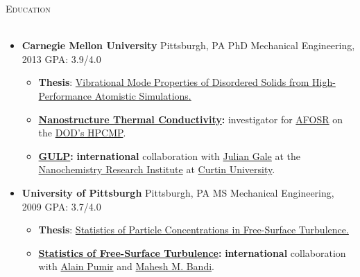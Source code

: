 \documentclass{article}
\newcommand{\area}[2]{\vspace*{-9pt} \begin{verse}\textbf{#1}   #2 \end{verse}  }
\newcommand{\lineunder}{\vspace*{-8pt} \\ \hspace*{-18pt} \hrulefill \\}
\newcommand{\header}[1]{{\hspace*{-15pt}\vspace*{6pt} \textsc{#1}} \vspace*{-6pt} \lineunder}
\newcommand{\schoolwithcourses}[3]{
 \textbf{#1} #2 $\bullet$ #3\\ 
\vspace*{5pt}
}
\begin{document}
\begin{itemize}
\header{\large{Education}}

\begin{itemize}[leftmargin=*]
  \item \textbf{Carnegie Mellon University} Pittsburgh, PA PhD Mechanical Engineering, 2013 GPA: 3.9/4.0
  \begin{itemize}
    \item \textbf{Thesis}: \href{http://jasonlarkin.github.io/projects-phd.html}
    {Vibrational Mode Properties of Disordered Solids from High-Performance Atomistic Simulations.}
    \item \textbf{\href{http://ntpl.me.cmu.edu/research.html}{Nanostructure Thermal Conductivity}:} investigator for  
\href{http://www.wpafb.af.mil/afrl/afosr/}{AFOSR} on the \href{http://www.hpcmo.hpc.mil/cms2/index.php}{DOD's HPCMP}.
    \item \textbf{\href{https://nanochemistry.curtin.edu.au/local/docs/gulp/gulp4.2_manual.pdf}{GULP}:} \textbf{international} collaboration with \href{http://nanochemistry.curtin.edu.au/people/staff.cfm/J.Gale}{Julian Gale} at the 
\href{http://nanochemistry.curtin.edu.au/}{Nanochemistry Research Institute} at \href{http://www.curtin.edu.au/}{Curtin University}.
  \end{itemize}

  \item \textbf{University of Pittsburgh} Pittsburgh, PA MS Mechanical Engineering, 2009 GPA: 3.7/4.0
  \begin{itemize}
    \item \textbf{Thesis}: \href{http://jasonlarkin.github.io/projects-ms.html}{Statistics of Particle Concentrations in Free-Surface Turbulence.} 
    \item \textbf{\href{http://jasonlarkin.github.io/projects-ms.html}{Statistics of Free-Surface Turbulence}:} \textbf{international} collaboration with \href{http://perso.ens-lyon.fr/alain.pumir/Pumir_webpage.html}{Alain Pumir} and \href{https://groups.oist.jp/ciu/mahesh-m-bandi}{Mahesh M. Bandi}. 
  \end{itemize}


\end{itemize}
\end{itemize}
\end{document}
